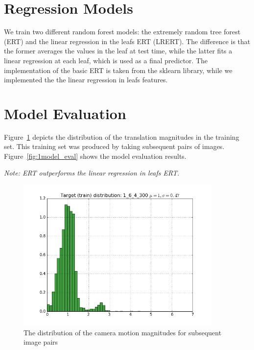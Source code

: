 \documentclass{article}
\begin{document}
\section{Regression Models}

We train two different random forest models: the extremely random tree
forest (ERT) and the linear regression in the leafs ERT (LRERT).  The
difference is that the former averages the values in the leaf at test
time, while the latter fits a linear regression at each leaf, which is
used as a final predictor.  The implementation of the basic ERT is
taken from the sklearn library, while we implemented the the linear
regression in leafs features.

\section{Model Evaluation}

Figure~\ref{fig:1train_t_distrib} depicts the distribution of the
translation magnitudes in the training set. This training set was
produced by taking subsequent pairs of
images. Figure~\ref{fig:1model_eval} shows the model evaluation
results.


\emph{Note: ERT outperforms the linear regression in leafs ERT}.

\begin{figure}[ht]
  \includegraphics[width=4.0in]{1train_t_distribution}
  \caption{The distribution of the camera motion magnitudes for subsequent image pairs}
  \label{fig:1train_t_distrib}
\end{figure}
\end{document}
